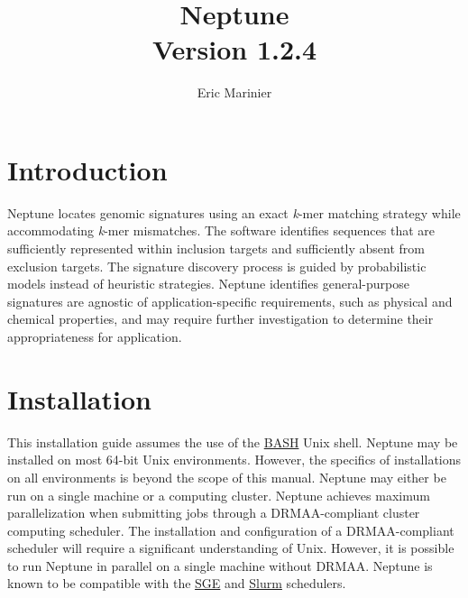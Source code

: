 \documentclass[a4paper,10pt]{article}
\title{Neptune\\ \normalsize Version 1.2.4}
\author{Eric Marinier}
\begin{document}



\maketitle

\newpage
\tableofcontents

\newpage
\section{Introduction}

Neptune locates genomic signatures using an exact \textit{k}-mer matching strategy while accommodating \textit{k}-mer mismatches. The software identifies sequences that are sufficiently represented within inclusion targets and sufficiently absent from exclusion targets. The signature discovery process is guided by probabilistic models instead of heuristic strategies. Neptune identifies general-purpose signatures are agnostic of application-specific requirements, such as physical and chemical properties, and may require further investigation to determine their appropriateness for application.

\newpage
\section{Installation}

This installation guide assumes the use of the \href{https://en.wikipedia.org/wiki/Bash_(Unix_shell)}{BASH} Unix shell. Neptune may be installed on most 64-bit Unix environments. However, the specifics of installations on all environments is beyond the scope of this manual. Neptune may either be run on a single machine or a computing cluster. Neptune achieves maximum parallelization when submitting jobs through a DRMAA-compliant cluster computing scheduler. The installation and configuration of a DRMAA-compliant scheduler will require a significant understanding of Unix. However, it is possible to run Neptune in parallel on a single machine without DRMAA. Neptune is known to be compatible with the \href{http://gridscheduler.sourceforge.net/}{SGE} and \href{http://slurm.schedmd.com/}{Slurm} schedulers.
\end{document}
